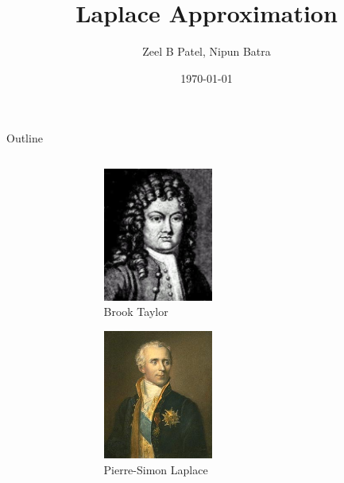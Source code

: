 \documentclass{beamer}
\begin{document}
\title{Laplace Approximation}
\author{Zeel B Patel, Nipun Batra}
\date{\today}
\maketitle


\begin{frame}{Outline}
    \begin{columns}
        \begin{column}{0.5\textwidth}
            \tableofcontents
        \end{column}
        \begin{column}{0.5\textwidth}
            \begin{figure}
                \includegraphics[width=0.4\textwidth]{../figures/laplace-approx/Taylor.jpg}
                \caption*{Brook Taylor}
            \end{figure}
            \begin{figure}
                \includegraphics[width=0.4\textwidth]{../figures/laplace-approx/Laplace.jpg}
                \caption*{Pierre-Simon Laplace}
            \end{figure}

        \end{column}
    \end{columns}
\end{frame}
\end{document}
